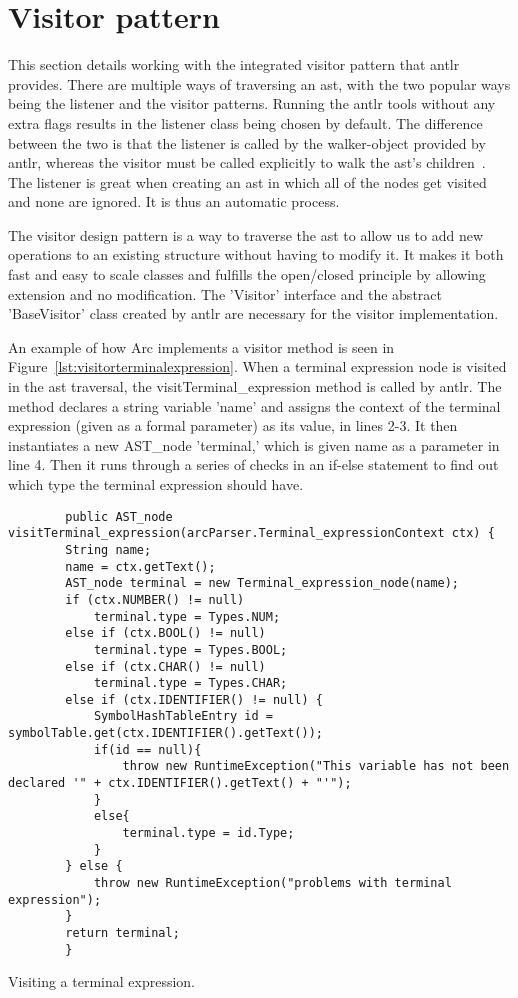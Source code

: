 \section{Visitor pattern}\label{sec:visitorpattern}
This section details working with the integrated visitor pattern that \gls{antlr} provides. There are multiple ways of traversing an \gls{ast}, with the two popular ways being the listener and the visitor patterns. Running the \gls{antlr} tools without any extra flags results in the listener class being chosen by default. The difference between the two is that the listener is called by the walker-object provided by \gls{antlr}, whereas the visitor must be called explicitly to walk the \gls{ast}'s children~\cite{Parr2014}. The listener is great when creating an \gls{ast} in which all of the nodes get visited and none are ignored. It is thus an automatic process.

The visitor design pattern is a way to traverse the \gls{ast} to allow us to add new operations to an existing structure without having to modify it. It makes it both fast and easy to scale classes and fulfills the open/closed principle by allowing extension and no modification. The 'Visitor' interface and the abstract 'BaseVisitor' class created by \gls{antlr} are necessary for the visitor implementation.

An example of how Arc implements a visitor method is seen in Figure~\ref{lst:visitorterminalexpression}. When a terminal expression node is visited in the \gls{ast} traversal, the visitTerminal\_expression method is called by \gls{antlr}. The method declares a string variable 'name' and assigns the context of the terminal expression (given as a formal parameter) as its value, in lines 2-3. It then instantiates a new AST\_node 'terminal,' which is given name as a parameter in line 4. Then it runs through a series of checks in an if-else statement to find out which type the terminal expression should have. 

\begin{listing}[htb!]
    \begin{verbatim}
        public AST_node visitTerminal_expression(arcParser.Terminal_expressionContext ctx) {
        String name;
        name = ctx.getText();
        AST_node terminal = new Terminal_expression_node(name);
        if (ctx.NUMBER() != null)
            terminal.type = Types.NUM;
        else if (ctx.BOOL() != null)
            terminal.type = Types.BOOL;
        else if (ctx.CHAR() != null)
            terminal.type = Types.CHAR;
        else if (ctx.IDENTIFIER() != null) {
            SymbolHashTableEntry id = symbolTable.get(ctx.IDENTIFIER().getText());
            if(id == null){
                throw new RuntimeException("This variable has not been declared '" + ctx.IDENTIFIER().getText() + "'");
            }
            else{
                terminal.type = id.Type;
            }
        } else {
            throw new RuntimeException("problems with terminal expression");
        }
        return terminal;
        }
    \end{verbatim}
    \caption{Visiting a terminal expression.}
    \label{lst:visitorterminalexpression}
\end{listing}


